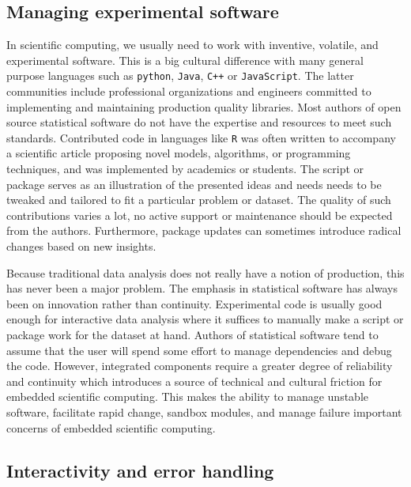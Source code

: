 \subsection{Managing experimental software}

In scientific computing, we usually need to work with inventive, volatile, and experimental software. This is a big cultural difference with many general purpose languages such as \texttt{python}, \texttt{Java}, \texttt{C++} or \texttt{JavaScript}. The latter communities include professional organizations and engineers committed to implementing and maintaining production quality libraries. Most authors of open source statistical software do not have the expertise and resources to meet such standards. Contributed code in languages like \texttt{R} was often written to accompany a scientific article proposing novel models, algorithms, or programming techniques, and was implemented by academics or students. The script or package serves as an illustration of the presented ideas and needs needs to be tweaked and tailored to fit a particular problem or dataset. The quality of such contributions varies a lot, no active support or maintenance should be expected from the authors. Furthermore, package updates can sometimes introduce radical changes based on new insights. 

Because traditional data analysis does not really have a notion of production, this has never been a major problem. The emphasis in statistical software has always been on innovation rather than continuity. Experimental code is usually good enough for interactive data analysis where it suffices to manually make a script or package work for the dataset at hand.
Authors of statistical software tend to assume that the user will spend some effort to manage dependencies and debug the code. However, integrated components require a greater degree of reliability and continuity which introduces a source of technical and cultural friction for embedded scientific computing. 
This makes the ability to manage unstable software, facilitate rapid change, sandbox modules, and manage failure important concerns of embedded scientific computing.

\subsection{Interactivity and error handling}

